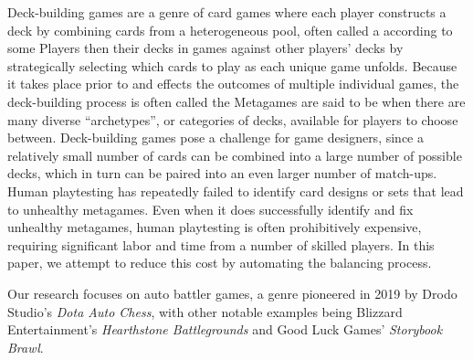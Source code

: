 
Deck-building games are a genre of card games where each player
constructs a deck by combining cards from a heterogeneous pool, often
called a  according to some  Players then  their decks in games against
other players' decks by strategically selecting which cards to play as
each unique game unfolds. Because it takes place prior to and effects
the outcomes of multiple individual games, the deck-building process
is often called the   Metagames are said to be
 when there are many diverse \enquote{archetypes}, or
categories of decks, available for players to choose between.
Deck-building games pose a challenge for game designers, since a
relatively small number of cards can be combined into a large number
of possible decks, which in turn can be paired into an even larger
number of match-ups. Human playtesting has repeatedly failed to
identify card designs or sets that lead to unhealthy metagames.
Even when it does successfully identify and fix unhealthy metagames,
human playtesting is often prohibitively expensive, requiring
significant labor and time from a number of skilled players. In this
paper, we attempt to reduce this cost by automating the balancing
process.

Our research focuses on auto battler games, a genre pioneered in 2019
by Drodo Studio's \textit{Dota Auto Chess}, with other notable
examples being Blizzard Entertainment's \textit{Hearthstone
  Battlegrounds} and Good Luck Games' \textit{Storybook Brawl}.
